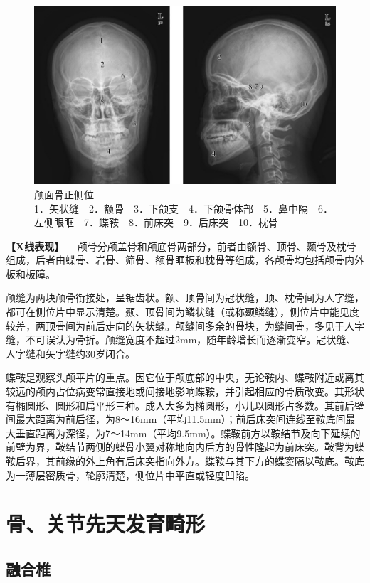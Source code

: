 \begin{figure}[!htbp]
 \centering
 \includegraphics{./images/Image00016.jpg}
 \captionsetup{justification=centering}
 \caption{颅面骨正侧位\\{\small 1．矢状缝　2．额骨　3．下颌支　4．下颌骨体部　5．鼻中隔　6．左侧眼眶　7．蝶鞍　8．前床突　9．后床突　10．枕骨}}
 \label{fig2-1-14}
  \end{figure} 

\textbf{【X线表现】}
　颅骨分颅盖骨和颅底骨两部分，前者由额骨、顶骨、颞骨及枕骨组成，后者由蝶骨、岩骨、筛骨、额骨眶板和枕骨等组成，各颅骨均包括颅骨内外板和板障。

颅缝为两块颅骨衔接处，呈锯齿状。额、顶骨间为冠状缝，顶、枕骨间为人字缝，都可在侧位片中显示清楚。颞、顶骨间为鳞状缝（或称颞鳞缝），侧位片中能见度较差，两顶骨间为前后走向的矢状缝。颅缝间多余的骨块，为缝间骨，多见于人字缝，不可误认为骨折。颅缝宽度不超过2mm，随年龄增长而逐渐变窄。冠状缝、人字缝和矢字缝约30岁闭合。

蝶鞍是观察头颅平片的重点。因它位于颅底部的中央，无论鞍内、蝶鞍附近或离其较远的颅内占位病变常直接地或间接地影响蝶鞍，并引起相应的骨质改变。其形状有椭圆形、圆形和扁平形三种。成人大多为椭圆形，小儿以圆形占多数。其前后壁间最大距离为前后径，为8～16mm（平均11.5mm）；前后床突间连线至鞍底间最大垂直距离为深径，为7～14mm（平均9.5mm）。蝶鞍前方以鞍结节及向下延续的前壁为界，鞍结节两侧的蝶骨小翼对称地向内后方的骨性隆起为前床突。鞍背为蝶鞍后界，其前缘的外上角有后床突指向外方。蝶鞍与其下方的蝶窦隔以鞍底。鞍底为一薄层密质骨，轮廓清楚，侧位片中平直或轻度凹陷。

\section{骨、关节先天发育畸形}

\subsection{融合椎}

